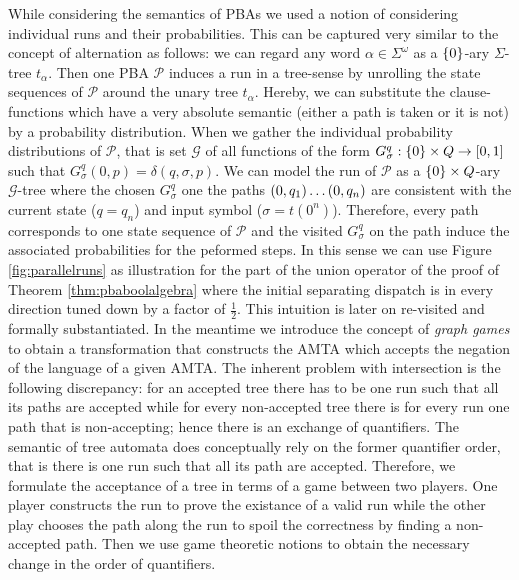 While considering the semantics of \acp{PBA} we used a notion of considering 
individual runs and their probabilities. This can be captured very similar to 
the concept of alternation as follows: we can regard any word 
$\alpha\in\Sigma^{\omega}$ as a $\left\{0\right\}$-ary $\Sigma$-tree $t_{\alpha}$. Then 
one \ac{PBA} $\mathcal{P}$ induces a run in a tree-sense by unrolling the state
sequences of $\mathcal{P}$ around the unary tree $t_{\alpha}$. Hereby, we can
substitute the clause-functions which have a very absolute semantic (either a
path is taken or it is not) by a probability distribution. When we gather the
individual probability distributions of $\mathcal{P}$, that is set 
$\mathcal{G}$ of all functions of the form 
$G_{\sigma}^{q}:\left\{0\right\}\times Q\rightarrow\left[0,1\right]$ such that
$G_{\sigma}^{q}(0, p) = \delta(q,\sigma, p)$. We can model the run of 
$\mathcal{P}$ as a $\left\{0\right\}\times Q$-ary $\mathcal{G}$-tree where the chosen
$G_{\sigma}^{q}$ one the paths $\left(0,q_{1}\right)\dots\left(0,q_{n}\right)$ are 
consistent with the current state ($q = q_{n}$) and input symbol 
($\sigma = t(0^n)$). Therefore, every path corresponds to one state sequence of 
$\mathcal{P}$ and the visited $G_{\sigma}^{q}$ on the path induce the 
associated probabilities for the peformed steps. In this sense we can use 
Figure \ref{fig:parallelruns} as illustration for the part of the union 
operator of the proof of Theorem \ref{thm:pbaboolalgebra} where the initial 
separating dispatch is in every direction tuned down by a factor of 
$\frac{1}{2}$. This intuition is later on re-visited and formally 
substantiated. In the meantime we introduce the concept of \emph{graph games} 
to obtain a transformation that constructs the \ac{AMTA} which accepts the 
negation of the language of a given \ac{AMTA}.
The inherent problem with intersection is the following discrepancy: for an 
accepted tree there has to be one run such that all its paths are accepted 
while for every non-accepted tree there is for every run one path that is 
non-accepting; hence there is an exchange of quantifiers. The semantic of tree
automata does conceptually rely on the former quantifier order, that is there
is one run such that all its path are accepted. Therefore, we formulate the 
acceptance of a tree in terms of a game between two players. One player 
constructs the run to prove the existance of a valid run while the other play 
chooses the path along the run to spoil the correctness by finding a 
non-accepted path. Then we use game theoretic notions to obtain the necessary
change in the order of quantifiers.

